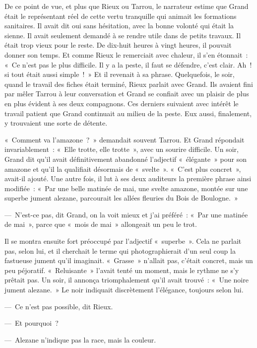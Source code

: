 \documentclass[french,twoside]{book} %
\begin{document}
De ce point de vue, et plus que Rieux ou Tarrou, le narrateur estime que Grand était le représentant réel de cette vertu tranquille qui animait les formations sanitaires. Il avait dit oui sans hésitation, avec la bonne volonté qui était la sienne. Il avait seulement demandé à se rendre utile dans de petits travaux. Il était trop vieux pour le reste. De dix-huit heures à vingt heures, il pouvait donner son temps. Et comme Rieux le remerciait avec chaleur, il s’en étonnait : « Ce n’est pas le plus difficile. Il y a la peste, il faut se défendre, c’est clair. Ah ! si tout était aussi simple ! » Et il revenait à sa phrase. Quelquefois, le soir, quand le travail des fiches était terminé, Rieux parlait avec Grand. Ils avaient fini par mêler Tarrou à leur conversation et Grand se confiait avec un plaisir de plus en plus évident à ses deux compagnons. Ces derniers suivaient avec intérêt le travail patient que Grand continuait au milieu de la peste. Eux aussi, finalement, y trouvaient une sorte de détente.\par
« Comment va l’amazone ? » demandait souvent Tarrou. Et Grand répondait invariablement : « Elle trotte, elle trotte », avec un sourire difficile. Un soir, Grand dit qu’il avait définitivement abandonné l’adjectif « élégante » pour son amazone et qu’il la qualifiait désormais de « svelte ». « C’est plus concret », avait-il ajouté. Une autre fois, il lut à ses deux auditeurs la première phrase ainsi modifiée : « Par une belle matinée de mai, une svelte amazone, montée sur une superbe jument alezane, parcourait les allées fleuries du Bois de Boulogne. »\par
— N’est-ce pas, dit Grand, on la voit mieux et j’ai préféré : « Par une matinée de mai », parce que « mois de mai » allongeait un peu le trot.\par
Il se montra ensuite fort préoccupé par l’adjectif « superbe ». Cela ne parlait pas, selon lui, et il cherchait le terme qui photographierait d’un seul coup la fastueuse jument qu’il imaginait. « Grasse » n’allait pas, c’était concret, mais un peu péjoratif. « Reluisante » l’avait tenté un moment, mais le rythme ne s’y prêtait pas. Un soir, il annonça triomphalement qu’il avait trouvé : « Une noire jument alezane. » Le noir indiquait discrètement l’élégance, toujours selon lui.\par
— Ce n’est pas possible, dit Rieux.\par
— Et pourquoi ?\par
— Alezane n’indique pas la race, mais la couleur.\par
\end{document}
